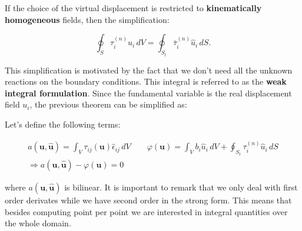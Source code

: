 	If the choice of the virtual displacement is restricted to \textbf{kinematically homogeneous} fields, then the simplification:
	
	\begin{equation}
	\oint _S \tau _i ^{(n)} \hat{u}_i \, dV = \oint _{S_t} \bar{\tau} _i ^{(n)} \hat{u}_i \, dS.
	\end{equation}
	
	This simplification is motivated by the fact that we don't need all the unknown reactions on the boundary conditions. This integral is referred to as the \textbf{weak integral formulation}. Since the fundamental variable is the real displacement field $u_i$, the previous theorem can be simplified as:
	
	\begin{center}
	\end{center}
	
	Let's define the following terms: 
	
	\begin{equation}
	\begin{array}{c}
	a(\bm{u, \hat{u}}) = \int _V \tau _{ij}(\bm{u})\hat{\epsilon}_{ij} \, dV \qquad \varphi (\bm{u}) = \int _V b_i \hat{u}_i \, dV +\oint _{S_t} \tau _{i}^{(n)} \hat{u}_i \, dS \\
	\Rightarrow a(\bm{u, \hat{u}})  - \varphi (\bm{u})  = 0
	\end{array}
	\end{equation}
	
	where $a(\bm{u, \hat{u}})$ is bilinear. It is important to remark that we only deal with first order derivates while we have second order in the strong form. This means that besides computing point per point we are interested in integral quantities over the whole domain.
	
